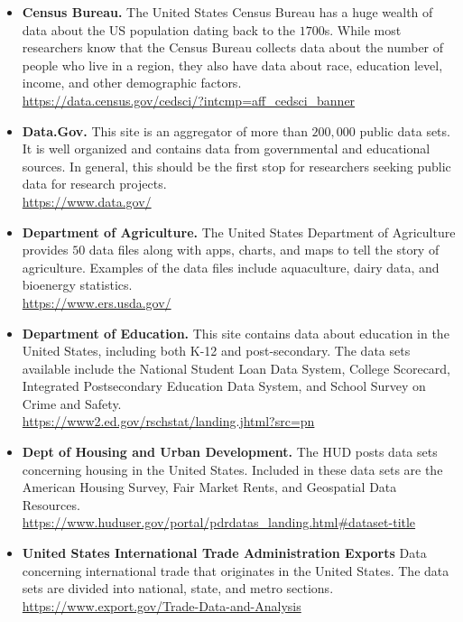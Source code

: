 \begin{itemize}
	\item \textbf{Census Bureau.} The United States Census Bureau has a huge wealth of data about the US population dating back to the $ 1700 $s. While most researchers know that the Census Bureau collects data about the number of people who live in a region, they also have data about race, education level, income, and other demographic factors. 
	\\ \url{https://data.census.gov/cedsci/?intcmp=aff_cedsci_banner}

	\item \textbf{Data.Gov.} This site is an aggregator of more than $ 200,000 $ public data sets. It is well organized and contains data from governmental and educational sources. In general, this should be the first stop for researchers seeking public data for research projects.
	\\ \url{https://www.data.gov/}

	\item \textbf{Department of Agriculture.} The United States Department of Agriculture provides $ 50 $ data files along with apps, charts, and maps to tell the story of agriculture. Examples of the data files include aquaculture, dairy data, and bioenergy statistics. 
	\\ \url{https://www.ers.usda.gov/}

	\item \textbf{Department of Education.} This site contains data about education in the United States, including both K-12 and post-secondary. The data sets available include the National Student Loan Data System, College Scorecard, Integrated Postsecondary Education Data System, and School Survey on Crime and Safety. 
	\\ \url{https://www2.ed.gov/rschstat/landing.jhtml?src=pn}

	\item \textbf{Dept of Housing and Urban Development.} The HUD posts data sets concerning housing in the United States. Included in these data sets are the American Housing Survey, Fair Market Rents, and Geospatial Data Resources. 
	\\ \url{https://www.huduser.gov/portal/pdrdatas_landing.html#dataset-title}

	\item \textbf{United States International Trade Administration Exports} Data concerning international trade that originates in the United States. The data sets are divided into national, state, and metro sections.   
	\\ \url{https://www.export.gov/Trade-Data-and-Analysis}


\end{itemize}
